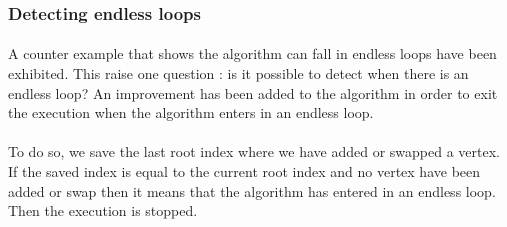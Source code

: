 \subsubsection{Detecting endless loops}
\paragraph{}
A counter example that shows the algorithm can fall in endless loops have been
exhibited. This raise one question : is it possible to detect when there is an
endless loop? An improvement has been added to the algorithm in order to exit the
execution when the algorithm enters in an endless loop.

\paragraph{}
To do so, we save the last root index where we have added or swapped a vertex. If
the saved index is equal to the current root index and no vertex have been
added or swap then it means that the algorithm has entered in an endless loop. Then
the execution is stopped.
